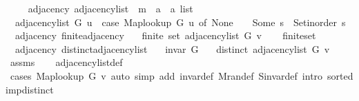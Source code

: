 \begin{isabellebody}
\ \ \isamarkupfalse%
\isanewline
{}\isamarkupfalse%
%
\endisatagproof
{\isafoldproof}%
%
\isadelimproof
\isanewline
%
\endisadelimproof
\isanewline
{}\isamarkupfalse%
\ {\isacharparenleft}{\kern0pt}\ adjacency{\isacharparenright}{\kern0pt}\ adjacency{\isacharunderscore}{\kern0pt}list\ {\isacharcolon}{\kern0pt}{\isacharcolon}{\kern0pt}\ {\isachardoublequoteopen}{\isacharprime}{\kern0pt}m\ {\isasymRightarrow}\ {\isacharprime}{\kern0pt}a\ {\isasymRightarrow}\ {\isacharprime}{\kern0pt}a\ list{\isachardoublequoteclose}\ \isanewline
\ \ {\isachardoublequoteopen}adjacency{\isacharunderscore}{\kern0pt}list\ G\ u\ {\isasymequiv}\ case\ Map{\isacharunderscore}{\kern0pt}lookup\ G\ u\ of\ None\ {\isasymRightarrow}\ {\isacharbrackleft}{\kern0pt}{\isacharbrackright}{\kern0pt}\ {\isacharbar}{\kern0pt}\ Some\ s\ {\isasymRightarrow}\ Set{\isacharunderscore}{\kern0pt}inorder\ s{\isachardoublequoteclose}\isanewline
\isanewline
{}\isamarkupfalse%
\ {\isacharparenleft}{\kern0pt}\ adjacency{\isacharparenright}{\kern0pt}\ finite{\isacharunderscore}{\kern0pt}adjacency{\isacharcolon}{\kern0pt}\isanewline
\ \ \ {\isachardoublequoteopen}finite\ {\isacharparenleft}{\kern0pt}set\ {\isacharparenleft}{\kern0pt}adjacency{\isacharunderscore}{\kern0pt}list\ G\ v{\isacharparenright}{\kern0pt}{\isacharparenright}{\kern0pt}{\isachardoublequoteclose}\isanewline
%
\isadelimproof
\ \ %
\endisadelimproof
%
\isatagproof
{}\isamarkupfalse%
\ finite{\isacharunderscore}{\kern0pt}set\isanewline
\ \ \isacommand{{\isachardot}{\kern0pt}}\isamarkupfalse%
%
\endisatagproof
{\isafoldproof}%
%
\isadelimproof
\isanewline
%
\endisadelimproof
\isanewline
{}\isamarkupfalse%
\ {\isacharparenleft}{\kern0pt}\ adjacency{\isacharparenright}{\kern0pt}\ distinct{\isacharunderscore}{\kern0pt}adjacency{\isacharunderscore}{\kern0pt}list{\isacharcolon}{\kern0pt}\isanewline
\ \ \ {\isachardoublequoteopen}invar\ G{\isachardoublequoteclose}\isanewline
\ \ \ {\isachardoublequoteopen}distinct\ {\isacharparenleft}{\kern0pt}adjacency{\isacharunderscore}{\kern0pt}list\ G\ v{\isacharparenright}{\kern0pt}{\isachardoublequoteclose}\isanewline
%
\isadelimproof
\ \ %
\endisadelimproof
%
\isatagproof
{}\isamarkupfalse%
\ assms\isanewline
\ \ \isamarkupfalse%
\ adjacency{\isacharunderscore}{\kern0pt}list{\isacharunderscore}{\kern0pt}def\isanewline
\ \ \isamarkupfalse%
\ {\isacharparenleft}{\kern0pt}cases\ {\isachardoublequoteopen}Map{\isacharunderscore}{\kern0pt}lookup\ G\ v{\isachardoublequoteclose}{\isacharparenright}{\kern0pt}\ {\isacharparenleft}{\kern0pt}auto\ simp\ add{\isacharcolon}{\kern0pt}\ invar{\isacharunderscore}{\kern0pt}def\ M{\isachardot}{\kern0pt}ran{\isacharunderscore}{\kern0pt}def\ S{\isachardot}{\kern0pt}invar{\isacharunderscore}{\kern0pt}def\ intro{\isacharcolon}{\kern0pt}\ sorted{\isacharunderscore}{\kern0pt}imp{\isacharunderscore}{\kern0pt}distinct{\isacharparenright}{\kern0pt}%

\end{isabellebody}
